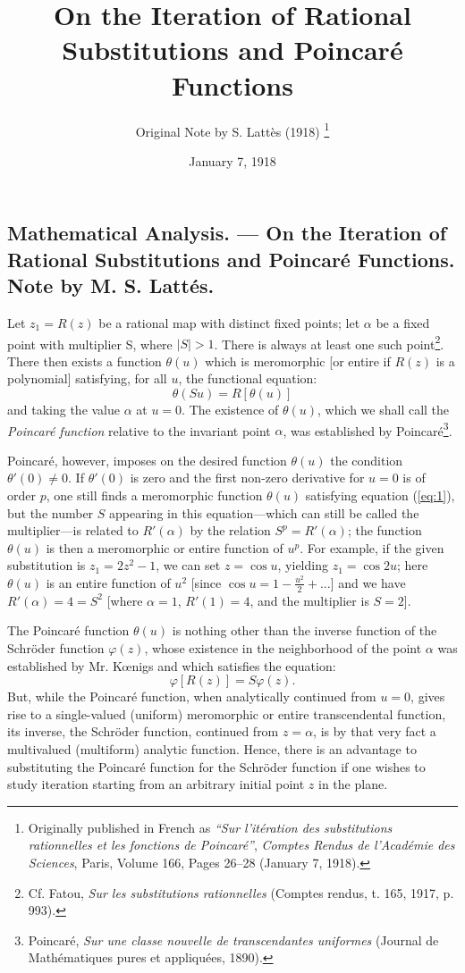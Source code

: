 \documentclass[12pt, a4paper]{article}
\title{On the Iteration of Rational Substitutions and Poincaré Functions}
\author{ Original Note by S. Lattès (1918) \thanks{ Originally published in
    French as \emph{``Sur l'itération des substitutions rationnelles et les
    fonctions de Poincaré''}, \emph{Comptes Rendus de l'Académie des Sciences},
    Paris, Volume 166, Pages 26--28 (January 7, 1918). } }
\date{January 7, 1918}
\begin{document}
\subsection*{Mathematical Analysis. --- On the Iteration of Rational
Substitutions and Poincaré Functions. Note by M. S. Lattés.}

Let $z_1 = R(z)$ be a rational map with distinct fixed points; let $\alpha$ be a
fixed point with multiplier S, where $|S| > 1$. There is always at least one
such point\footnote{\foreignlanguage{french}{Cf. Fatou, \emph{Sur les
substitutions rationnelles} (Comptes rendus, t. 165, 1917, p. 993).}}. There
then exists a function $\theta(u)$ which is meromorphic [or entire if $R(z)$ is
a polynomial] satisfying, for all $u$, the functional equation:
\begin{equation}
    \label{eq:1}
    \theta(Su) = R[\theta(u)]
\end{equation}
and taking the value $\alpha$ at $u = 0$. The existence of $\theta(u)$, which we
shall call the \emph{Poincaré function} relative to the invariant point
$\alpha$, was established by
Poincaré\footnote{\foreignlanguage{french}{Poincaré, \emph{Sur une classe
nouvelle de transcendantes uniformes} (Journal de Mathématiques pures et
appliquées, 1890).}}.

\vspace{1em}
{
\small
Poincaré, however, imposes on the desired function $\theta(u)$ the condition
$\theta'(0) \neq 0$. If $\theta'(0)$ is zero and the first non-zero derivative
for $u = 0$ is of order $p$, one still finds a meromorphic function $\theta(u)$
satisfying equation (\ref{eq:1}), but the number $S$ appearing in this equation---which
can still be called the multiplier---is related to $R'(\alpha)$ by the relation
$S^p = R'(\alpha)$; the function $\theta(u)$ is then a meromorphic or entire
function of $u^p$. For example, if the given substitution is $z_1 = 2z^2 - 1$,
we can set $z = \cos u$, yielding $z_1 = \cos 2u$; here $\theta(u)$ is an entire
function of $u^2$ [since $\cos u = 1 - \frac{u^2}{2} + \dots$] and we have
$R'(\alpha) = 4 = S^2$ [where $\alpha = 1$, $R'(1) = 4$, and the multiplier is
$S = 2$].
}
\vspace{1em}

The Poincaré function $\theta(u)$ is nothing other than the inverse function of
the Schröder function $\varphi(z)$, whose existence in the neighborhood of the
point $\alpha$ was established by Mr. K\oe nigs and which satisfies the
equation:
\[
    \varphi[R(z)] = S\varphi(z).
\]
But, while the Poincaré function, when analytically continued from $u = 0$,
gives rise to a single-valued (uniform) meromorphic or entire transcendental
function, its inverse, the Schröder function, continued from $z = \alpha$, is by
that very fact a multivalued (multiform) analytic function. Hence, there is an
advantage to substituting the Poincaré function for the Schröder function if one
wishes to study iteration starting from an arbitrary initial point $z$ in the
plane.
\end{document}
